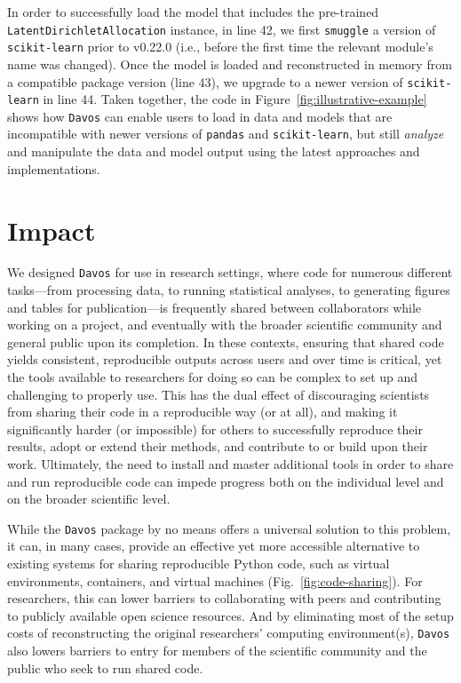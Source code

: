 \documentclass[preprint,12pt,a4paper]{elsarticle}
\begin{document}
In order to successfully load the model that includes the pre-trained
\texttt{Latent\-Dir\-ich\-let\-Allocation} instance, in line 42, we first
\texttt{smuggle} a version of \texttt{scikit-learn} prior to v0.22.0 (i.e.,
before the first time the relevant module's name was changed). Once
the model is loaded and reconstructed in memory from a compatible
package version (line 43), we upgrade to a newer version of
\texttt{scikit-learn} in line 44. Taken together, the code in
Figure~\ref{fig:illustrative-example} shows how \texttt{Davos} can
enable users to load in data and models that are incompatible with
newer versions of \texttt{pandas} and \texttt{scikit-learn}, but still
\textit{analyze} and manipulate the data and model output using the
latest approaches and implementations.


\section{Impact}\label{sec:impact}

We designed \texttt{Davos} for use in research settings, where code for numerous different tasks---from processing data, to running statistical analyses, to generating figures and tables for publication---is frequently shared between collaborators while working on a project, and eventually with the broader scientific community and general public upon its completion.
In these contexts, ensuring that shared code yields consistent, reproducible outputs across users and over time is critical, yet the tools available to researchers for doing so can be complex to set up and challenging to properly use.
This has the dual effect of discouraging scientists from sharing their code in a reproducible way (or at all), and making it significantly harder (or impossible) for others to successfully reproduce their results, adopt or extend their methods, and contribute to or build upon their work.
Ultimately, the need to install and master additional tools in order to share and run reproducible code can impede progress both on the individual level and on the broader scientific level.

While the \texttt{Davos} package by no means offers a universal solution to this problem, it can, in many cases, provide an effective yet more accessible alternative to existing systems for sharing reproducible Python code, such as virtual environments, containers, and virtual machines (Fig.~\ref{fig:code-sharing}).
For researchers, this can lower barriers to collaborating with peers and contributing to publicly available open science resources.
And by eliminating most of the setup costs of reconstructing the original researchers' computing environment(s), \texttt{Davos} also lowers barriers to entry for members of the scientific community and the public who seek to run shared code.
\end{document}
